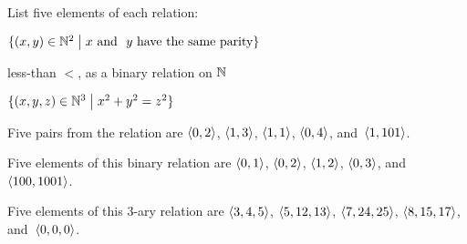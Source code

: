 \documentclass{test}  %
\begin{document}
\begin{problem}
List five elements of each relation:
\begin{items}
\item $\{(x,y)\in \mathbb{N}^2 \bigm| \text{$x$ and ~$y$ have the same parity}\}$
\item less-than $<$, as a binary relation on $\mathbb{N}$
\item $\{(x,y,z)\in\mathbb{N}^3 \bigm| x^2+y^2=z^2\}$
\end{items}
\begin{answer}
\begin{items}
\item Five pairs from the relation are
  $\langle0,2\rangle$, $\langle1,3\rangle$, $\langle1,1\rangle$, 
  $\langle0,4\rangle$, 
 and~$\langle1,101\rangle$.    
\item Five elements of this binary relation are 
  $\langle0,1\rangle$, $\langle0,2\rangle$, $\langle1,2\rangle$, $\langle0,3\rangle$,
  and~$\langle100,1001\rangle$. 
\item Five elements of this $3$-ary relation are
  $\langle3,4,5\rangle$, $\langle5,12,13\rangle$, $\langle7,24,25\rangle$, 
  $\langle8,15,17\rangle$, and~$\langle0,0,0\rangle$.
\end{items}
\end{answer}
\end{problem}
\end{document}
